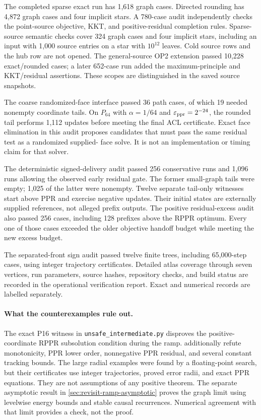 The completed sparse exact run has 1,618 graph cases. Directed rounding has
4,872 graph cases and four implicit stars. A 780-case audit independently
checks the point-source objective, KKT, and positive-residual completion
rules. Sparse-source semantic checks cover 324 graph cases and four
implicit stars, including an input with 1,000 source entries on a star
with $10^{12}$ leaves. Cold source rows and the hub row are not opened.
The general-source OP2 extension passed 10,228 exact/rounded cases; a later
652-case run added the maximum-principle and KKT/residual assertions.
These scopes are distinguished in the saved source snapshots.

The coarse randomized-face interface passed 36 path cases, of which 19
needed nonempty coordinate tails. On $P_{64}$ with $\alpha=1/64$ and
$\varepsilon_{\mathrm{ppr}}=2^{-24}$, the rounded tail performs 1,112 updates before meeting
the final ACL certificate. Exact face elimination in this audit proposes
candidates that must pass the same residual test as a randomized supplied-
face solve. It is not an implementation or timing claim for that solver.

The deterministic signed-delivery audit passed 256 conservative runs and
1,096 runs allowing the observed early residual gate. The former small-graph
tails were empty; 1,025 of the latter were nonempty. Twelve separate
tail-only witnesses start above PPR and exercise negative updates. Their
initial states are externally supplied references, not alleged prefix
outputs. The positive residual-excess audit also passed 256 cases, including
128 prefixes above the RPPR optimum. Every one of those cases exceeded
the older objective handoff budget while meeting the new excess budget.

The separated-front sign audit passed twelve finite trees, including
65,000-step cases, using integer trajectory certificates. Detailed atlas
coverage through seven vertices, run parameters, source hashes, repository
checks, and build status are recorded in the operational verification report.
Exact and numerical records are labelled separately.

\paragraph{What the counterexamples rule out.}
The exact P16 witness in \texttt{unsafe\_intermediate.py} disproves the
positive-coordinate RPPR subsolution condition during the ramp.
 additionally
refute monotonicity, PPR lower order, nonnegative PPR residual, and several
constant tracking bounds. The large radial examples were found by a
floating-point search, but their certificates use integer trajectories,
proved error radii, and exact PPR equations. They are not assumptions of
any positive theorem. The separate asymptotic result in
\cref{sec:revisit-ramp-asymptotic} proves the graph limit using levelwise
energy bounds and stable causal recurrences. Numerical agreement with that
limit provides a check, not the proof.

